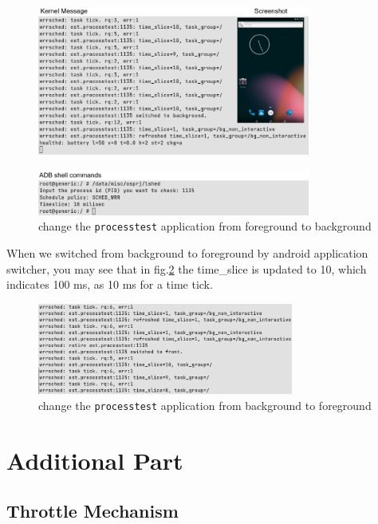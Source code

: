 \documentclass[11pt]{article}
\begin{document}
\begin{figure}[H]
\centering
\includegraphics[width=0.8\textwidth]{.split/fg-to-bg.1.png}
\end{figure}
\begin{figure}[H]\ContinuedFloat
  \centering
  \includegraphics[width=0.8\textwidth]{.split/fg-to-bg.2.png}
  \caption{change the \texttt{processtest} application from foreground to
  background}
  \label{fig:fg2bg}
  \end{figure}

When we switched from background to foreground by android
application switcher, you may see that in fig.\ref{fig:bg2fg}
the time\_slice is updated to 10,
which indicates 100 ms, as 10 ms for a time tick.

\begin{figure}[htb!]
\centering
\includegraphics[width=0.75\textwidth]{bg-to-fg.png}
\caption{change the \texttt{processtest} application from background to
foreground}
\label{fig:bg2fg}
\end{figure}

\section{Additional Part}\label{additional-part}

\subsection{Throttle Mechanism}\label{throttle-mechanism}
\end{document}
